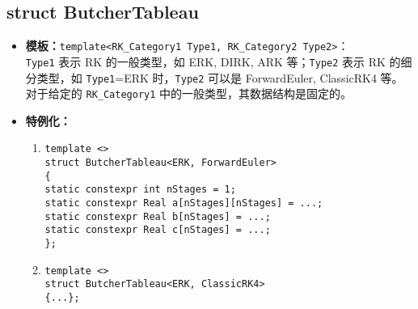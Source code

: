 \documentclass[a4paper,twoside]{ctexart}
\begin{document}
\subsection{struct ButcherTableau}
\begin{itemize}
    \item \textbf{模板：}\texttt{template<RK\_Category1 Type1, RK\_Category2 Type2>}：\\\texttt{Type1} 表示 RK 的一般类型，如 ERK, DIRK, ARK 等；\texttt{Type2} 表示 RK 的细分类型，如 \texttt{Type1}=ERK 时，\texttt{Type2} 可以是 ForwardEuler, ClassicRK4 等。对于给定的 \texttt{RK\_Category1} 中的一般类型，其数据结构是固定的。
    \item \textbf{特例化：}
            \begin{enumerate}[(1)]
                \item \texttt{template <>\\
                struct ButcherTableau<ERK, ForwardEuler>\\
                \{\\
                \hspace*{4pt} static constexpr int nStages = 1;\\
                \hspace*{4pt} static constexpr Real a[nStages][nStages] = ...;\\
                \hspace*{4pt} static constexpr Real b[nStages] = ...;\\
                \hspace*{4pt} static constexpr Real c[nStages] = ...;\\
                \};}
            \item \texttt{template <>\\
                struct ButcherTableau<ERK, ClassicRK4>\\
                \{...\};}
            \end{enumerate} 
\end{itemize}
\end{document}
